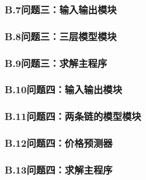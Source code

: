 

\subsubsection*{B.7\quad 问题三：输入输出模块}



\subsubsection*{B.8\quad 问题三：三层模型模块}



\subsubsection*{B.9\quad 问题三：求解主程序}



\subsubsection*{B.10\quad 问题四：输入输出模块}



\subsubsection*{B.11\quad 问题四：两条链的模型模块}



\subsubsection*{B.12\quad 问题四：价格预测器}



\subsubsection*{B.13\quad 问题四：求解主程序}


